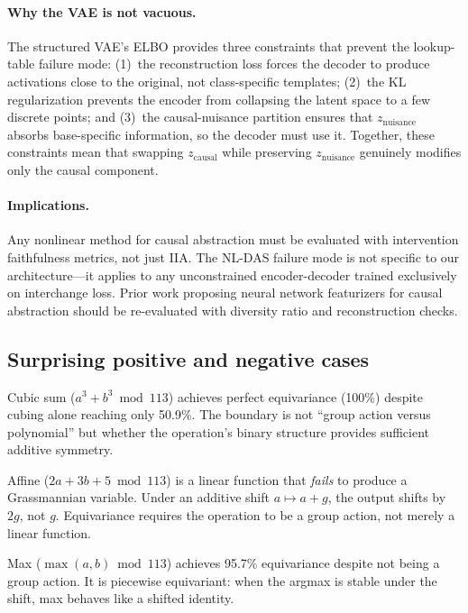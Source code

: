 \documentclass{article}
\begin{document}
\paragraph{Why the VAE is not vacuous.}
The structured VAE's ELBO provides three constraints that prevent the
lookup-table failure mode: (1)~the reconstruction loss forces the decoder to
produce activations close to the original, not class-specific templates;
(2)~the KL regularization prevents the encoder from collapsing the latent space
to a few discrete points; and (3)~the causal-nuisance partition ensures that
$z_\text{nuisance}$ absorbs base-specific information, so the decoder must use
it. Together, these constraints mean that swapping $z_\text{causal}$ while
preserving $z_\text{nuisance}$ genuinely modifies only the causal component.

\paragraph{Implications.}
Any nonlinear method for causal abstraction must be evaluated with intervention
faithfulness metrics, not just IIA. The NL-DAS failure mode is not specific to
our architecture---it applies to any unconstrained encoder-decoder trained
exclusively on interchange loss. Prior work proposing neural network featurizers
for causal abstraction \citep{geiger2024causal} should be re-evaluated with
diversity ratio and reconstruction checks.

\subsection{Surprising positive and negative cases}

Cubic sum ($a^3 + b^3 \bmod 113$) achieves perfect equivariance (100\%) despite
cubing alone reaching only 50.9\%. The boundary is not ``group action versus
polynomial'' but whether the operation's binary structure provides sufficient
additive symmetry.

Affine ($2a + 3b + 5 \bmod 113$) is a linear function that \emph{fails} to
produce a Grassmannian variable. Under an additive shift $a \mapsto a + g$, the
output shifts by $2g$, not $g$. Equivariance requires the operation to be a group
action, not merely a linear function.

Max ($\max(a,b) \bmod 113$) achieves 95.7\% equivariance despite not being a
group action. It is piecewise equivariant: when the argmax is stable under the
shift, max behaves like a shifted identity.
\end{document}
